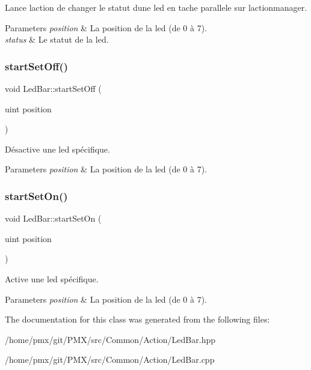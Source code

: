 Lance l\textquotesingle{}action de changer le statut d\textquotesingle{}une led en tache parallele sur l\textquotesingle{}actionmanager. 


\begin{DoxyParams}{Parameters}
{\em position} & La position de la led (de 0 à 7). \\
\hline
{\em status} & Le statut de la led. \\
\hline
\end{DoxyParams}
\mbox{\label{classLedBar_ad37f92ef4b6487afc785d739a59a32aa}} 
\subsubsection{\texorpdfstring{start\+Set\+Off()}{startSetOff()}}
{\footnotesize\ttfamily void Led\+Bar\+::start\+Set\+Off (\begin{DoxyParamCaption}\item[{uint}]{position }\end{DoxyParamCaption})\hspace{0.3cm}{\ttfamily [inline]}}



Désactive une led spécifique. 


\begin{DoxyParams}{Parameters}
{\em position} & La position de la led (de 0 à 7). \\
\hline
\end{DoxyParams}
\mbox{\label{classLedBar_af2eb11c44122b3206a657eb3b0b6f05e}} 
\subsubsection{\texorpdfstring{start\+Set\+On()}{startSetOn()}}
{\footnotesize\ttfamily void Led\+Bar\+::start\+Set\+On (\begin{DoxyParamCaption}\item[{uint}]{position }\end{DoxyParamCaption})\hspace{0.3cm}{\ttfamily [inline]}}



Active une led spécifique. 


\begin{DoxyParams}{Parameters}
{\em position} & La position de la led (de 0 à 7). \\
\hline
\end{DoxyParams}


The documentation for this class was generated from the following files\+:\begin{DoxyCompactItemize}
\item 
/home/pmx/git/\+P\+M\+X/src/\+Common/\+Action/Led\+Bar.\+hpp\item 
/home/pmx/git/\+P\+M\+X/src/\+Common/\+Action/Led\+Bar.\+cpp\end{DoxyCompactItemize}
